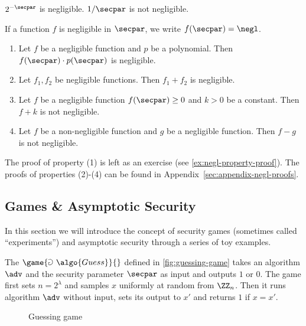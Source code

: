 \begin{example}
  $2^{-\secpar}$ is negligible. $1/\secpar$ is not negligible.
\end{example}

If a function $f$ is negligible in $\secpar$, we write $f(\secpar) = \negl$.


\begin{lemma}
  \label{lem:negl}
  \hfill
  \begin{enumerate}
  \item Let $f$ be a negligible function and $p$ be a polynomial. Then $f(\secpar) \cdot p(\secpar)$ is negligible.
  \item Let $f_1, f_2$ be negligible functions. Then $f_1 + f_2$ is negligible.
  \item Let $f$ be a negligible function $f(\secpar) \ge 0$ and $k > 0$ be a constant. Then $f + k$ is not negligible.
  \item Let $f$ be a non-negligible function and $g$ be a negligible function. Then $f - g$ is not negligible.
  \end{enumerate}
\end{lemma}

The proof of property (1) is left as an exercise (see \autoref{ex:negl-property-proof}).
The proofs of properties (2)-(4) can be found in Appendix~\ref{sec:appendix-negl-proofs}.

\subsection{Games \& Asymptotic Security}

In this section we will introduce the concept of security games (sometimes called ``experiments'') and asymptotic security through a series of toy examples.

The $\game{\Game~\algo{Guess}}{}$ defined in \autoref{fig:guessing-game} takes an algorithm $\adv$ and the security parameter $\secpar$ as input and outputs $1$ or $0$.
The game first sets $n = 2^\lambda$ and samples $x$ uniformly at random from $\ZZ_n$.
Then it runs algorithm $\adv$ without input, sets its output to $x'$ and returns $1$ if $x = x'$.

\begin{figure}[tbhp]
  \begin{center}
    \begin{tcolorbox}[width=3cm]
      \begin{pchstack}[center]
      \end{pchstack}
    \end{tcolorbox}
  \end{center}
  \caption{Guessing game\label{fig:guessing-game}}
\end{figure}

